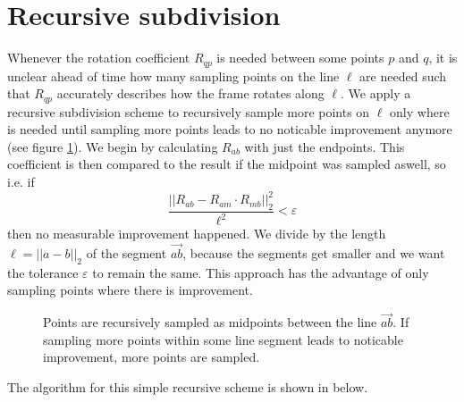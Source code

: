 \documentclass[../thesis.tex]{subfiles}
\begin{document}
\section{Recursive subdivision}
Whenever the rotation coefficient $R_{qp}$ is needed between some points $p$ and $q$,
it is unclear ahead of time how many sampling points on the line $\ell$
are needed such that $R_{qp}$ accurately describes how the frame rotates along $\ell$.
We apply a recursive subdivision scheme to recursively sample more points on $\ell$ only where is needed
until sampling more points leads to no noticable improvement anymore (see figure \ref{fig:recursiveSubdivision}).
We begin by calculating $R_{ab}$ with just the endpoints. This coefficient is then compared to the result if the midpoint was sampled aswell,
so i.e. if
$$\frac{||R_{ab} - R_{am}\cdot R_{mb}||^2_2}{\ell^2}< \varepsilon$$
then no measurable improvement happened. We divide by the length $\ell = ||a-b||_2$ of the segment $\vec{ab}$, because the segments get smaller
and we want the tolerance $\varepsilon$ to remain the same.
This approach has the advantage of only sampling points where there is improvement.
\begin{figure}[htb]
  \centering
  \def\svgwidth{20em}
  
  \caption{Points are recursively sampled as midpoints between the line $\vec{ab}$.
  If sampling more points within some line segment leads to noticable improvement, more points are sampled.}
  \label{fig:recursiveSubdivision}
\end{figure}
The algorithm for this simple recursive scheme is shown in below.
\end{document}
